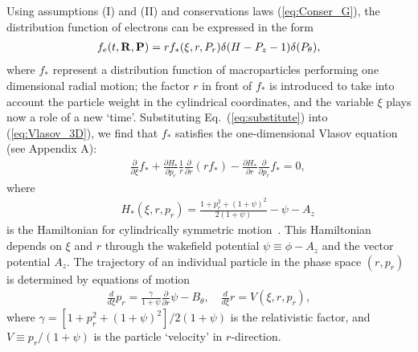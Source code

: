 \documentclass[twocolumn,showpacs,aip]{revtex4}
\begin{document}
Using assumptions (I) and (II) and conservations laws (\ref{eq:Conser_G}),  the distribution function of electrons can be expressed in the form
\begin{eqnarray}
f_e(t,{\bf{R}},{\bf{P}})=rf_{*}(\xi,{{r}},{{P}}_{r})\delta(H -P_z-1)\delta(P_{\theta}),
\label{eq:substitute}
\end{eqnarray}
where $f_*$ represent a distribution function    of macroparticles performing one dimensional radial motion; the factor $r$ in front of $f_*$ is introduced to take into account the particle weight in the cylindrical coordinates, and the variable $\xi$ plays now a role of a new `time'.  
Substituting Eq.~(\ref{eq:substitute}) into (\ref{eq:Vlasov_3D}), we find that $f_*$ satisfies the one-dimensional Vlasov equation  (see Appendix A):
\begin{eqnarray}
&&\frac{\partial }{\partial\xi}{f_{*}} +\frac{\partial H_*}{\partial {{p}}_{r}}\frac{1}{r}\frac{\partial }{\partial {{r}}}(rf_{*})-\frac{\partial H_*}{\partial {{r}}}\frac{\partial }{\partial {{p}}_{r}}f_{*}=0,\label{eq:Vlasov_1D}
\end{eqnarray}
where 
\begin{eqnarray}
&& H_*(\xi, r,p_r)=\frac{1+{{p}}_{r}^2+(1+\psi)^2}{2(1+\psi)}-\psi-A_z\label{eq:H_1D}
\end{eqnarray}
is the  Hamiltonian for cylindrically symmetric motion~\cite{Mora_1997}. This Hamiltonian   depends on $\xi$ and  $r$ through the wakefield potential $\psi\equiv\phi-A_z$ and the vector potential $A_z$. The trajectory of an individual particle in the phase space $(r,p_r)$  is determined by equations of motion
\begin{eqnarray}
\frac{d}{d\xi}{p}_{r}=\frac{\gamma}{1+\psi}\frac{\partial}{\partial r}\psi -B_{\theta}, \quad
\frac{d}{d\xi}r=V(\xi,r,p_r), \label{eq:EoM_1r}
\end{eqnarray}
 where $\gamma=[{1+{{p}}_{r}^2+(1+\psi)^2}]/{2(1+\psi)}$ is the relativistic factor, and $V\equiv {p_{r}}/({1+\psi})$ is the particle `velocity' in $r$-direction.%
\end{document}
